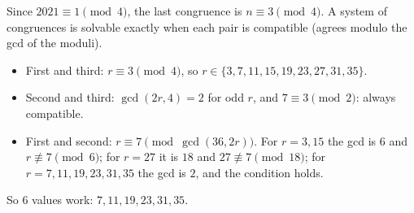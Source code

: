 Since $2021\equiv1\pmod4$, the last congruence is $n\equiv3\pmod4$. A system of congruences is solvable exactly when each pair is compatible (agrees modulo the gcd of the moduli).
\begin{itemize}
\item First and third: $r\equiv3\pmod4$, so $r\in\{3,7,11,15,19,23,27,31,35\}$.
\item Second and third: $\gcd(2r,4)=2$ for odd $r$, and $7\equiv3\pmod2$: always compatible.
\item First and second: $r\equiv7\pmod{\gcd(36,2r)}$. For $r=3,15$ the gcd is $6$ and $r\not\equiv7\pmod6$; for $r=27$ it is $18$ and $27\not\equiv7\pmod{18}$; for $r=7,11,19,23,31,35$ the gcd is $2$, and the condition holds.
\end{itemize}
So $\boxed{6}$ values work: $7,11,19,23,31,35$.
